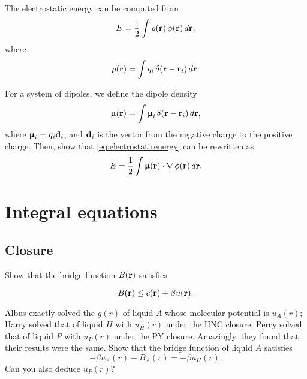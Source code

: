\documentclass{book}
\begin{document}

The electrostatic energy can be computed from
\begin{equation}
  E = \frac{1}{2} \int \rho(\boldsymbol{\mathbf{r}}) \, \phi(\boldsymbol{\mathbf{r}}) \, d\boldsymbol{\mathbf{r}},
  \label{eq:electrostaticenergy}
\end{equation}
where
\[
  \rho(\boldsymbol{\mathbf{r}}) = \int q_i \, \delta(\boldsymbol{\mathbf{r}} - \boldsymbol{\mathbf{r}}_i) \, d\boldsymbol{\mathbf{r}}.
\]

For a system of dipoles, we define the dipole density
\[
  \boldsymbol{\mathbf{\upmu}}(\boldsymbol{\mathbf{r}}) = \int \boldsymbol{\mathbf{\upmu}}_i \, \delta(\boldsymbol{\mathbf{r}} - \boldsymbol{\mathbf{r}}_i) \, d\boldsymbol{\mathbf{r}},
\]
where $\boldsymbol{\mathbf{\upmu}}_i = q_i \boldsymbol{\mathbf{d}}_i$,
and $\boldsymbol{\mathbf{d}}_i$ is the vector from the negative charge to the positive charge.
%
Then, show that \eqref{eq:electrostaticenergy} can be rewritten as
\[
  E = \frac{1}{2} \int \boldsymbol{\mathbf{\upmu}}(\boldsymbol{\mathbf{r}}) \cdot \nabla \, \phi(\boldsymbol{\mathbf{r}}) \, d\boldsymbol{\mathbf{r}}.
\]







\chapter{Integral equations}



\section{Closure}




Show that the bridge function $B(\boldsymbol{\mathbf{r}})$ satisfies\cite{kast2012}

\begin{equation}
  B(\boldsymbol{\mathbf{r}}) \le c(\boldsymbol{\mathbf{r}}) + \beta u(\boldsymbol{\mathbf{r}}).
\end{equation}





Albus exactly solved the $g(r)$ of liquid $A$ whose molecular potential is $u_A(r)$;
Harry solved that of liquid $H$ with $u_H(r)$ under the HNC closure;
Percy solved that of liquid $P$ with $u_P(r)$ under the PY closure.
Amazingly, they found that their results were the same.
Show that the bridge function of liquid $A$ satisfies
\begin{equation}
  -\beta u_A(r) + B_A(r) = -\beta u_H(r).
\end{equation}
Can you also deduce $u_P(r)$?
\end{document}
